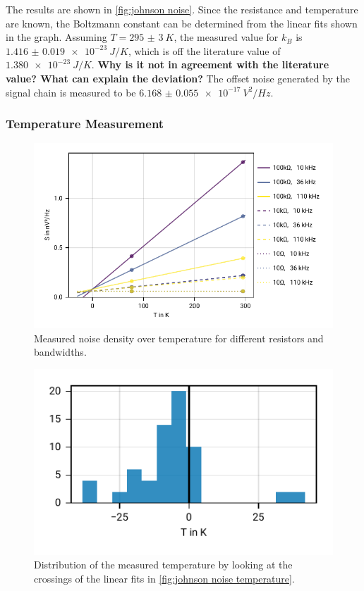 \documentclass[
    parskip=half, 
    twoside=false,
    twocolumn=true,
    fontsize=11pt,
]{scrarticle}
\begin{document}
The results are shown in \autoref{fig:johnson noise}. Since the resistance and temperature are known, the Boltzmann constant can be determined from the linear fits shown in the graph. Assuming $T=\SI{295(3)}{K}$, the measured value for $k_B$ is $\SI{1.416(19)e-23}{J/K}$, which is off the literature value of $\SI{1.380e-23}{J/K}$.
\textbf{Why is it not in agreement with the literature value? What can explain the deviation?} 
The offset noise generated by the signal chain is measured to be $\SI{6.168(55)e-17}{V^2/Hz}$.


\subsubsection*{Temperature Measurement}
\begin{figure}[h!]
    \centering
    \includegraphics{figures/02 temperature.pdf}
    \caption{
        Measured noise density over temperature for different resistors and bandwidths.
    }
    \label{fig:johnson noise temperature}
\end{figure}
\begin{figure}[h!]
    \centering
    \includegraphics{figures/02 temperature distribution.pdf}
    \caption{
        Distribution of the measured temperature by looking at the crossings of the linear fits in \autoref{fig:johnson noise temperature}.
    }
    \label{fig:johnson noise temperature distribution}
\end{figure}
\end{document}
